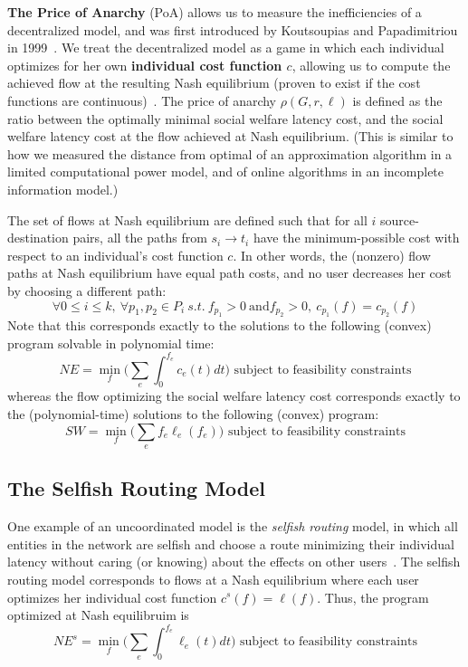 \medskip
\textbf{The Price of Anarchy} (PoA) allows us to measure the inefficiencies of a decentralized model, and was first introduced by Koutsoupias and Papadimitriou in 1999~\cite{poa}. 
We treat the decentralized model as a game in which each individual optimizes for her own \textbf{individual cost function $c$}, allowing us to compute the achieved flow at the resulting Nash equilibrium (proven to exist if the cost functions are continuous)~\cite{wardrop,haurie,beckmann1956studies}.
The price of anarchy $\rho(G,r,\ell)$ is defined as the ratio between the optimally minimal social welfare latency cost, and the social welfare latency cost at the flow achieved at Nash equilibrium.
(This is similar to how we measured the distance from optimal of an approximation algorithm in a limited computational power model, and of online algorithms in an incomplete information model.)

The set of flows at Nash equilibrium are defined such that for all $i$ source-destination pairs, all the paths from $s_i \to t_i$ have the minimum-possible cost with respect to an individual's cost function $c$. In other words, the (nonzero) flow paths at Nash equilibrium have equal path costs, and no user decreases her cost by choosing a different path:
$$\forall 0\le i \le k,~\forall p_1, p_2\in P_i~s.t.~f_{p_1} > 0~\text{and} f_{p_2} > 0,~ c_{p_1}(f) = c_{p_2}(f)$$
Note that this corresponds exactly to the solutions to the following (convex) program solvable in polynomial time:
$$NE = \min_f\Big(\sum_e \int_0^{f_e} c_e(t)dt\Big) \text{ subject to feasibility constraints}$$
whereas the flow optimizing the social welfare latency cost corresponds exactly to the (polynomial-time) solutions to the following (convex) program: 
$$SW = \min_f\Big(\sum_e f_e\ell_e(f_e)\Big) \text{ subject to feasibility constraints}$$

\subsection{The Selfish Routing Model}
One example of an uncoordinated model is the \emph{selfish routing} model, in which all entities in the network are selfish and choose a route minimizing their individual latency without caring (or knowing) about the effects on other users~\cite{tardos}.
The selfish routing model corresponds to flows at a Nash equilibrium where each user optimizes her individual cost function
$c^s(f) = \ell(f)$.
Thus, the program optimized at Nash equilibruim is
$$NE^{s} = \min_f\Big(\sum_e \int_0^{f_e} \ell_e(t)dt\Big) \text{ subject to feasibility constraints}$$

